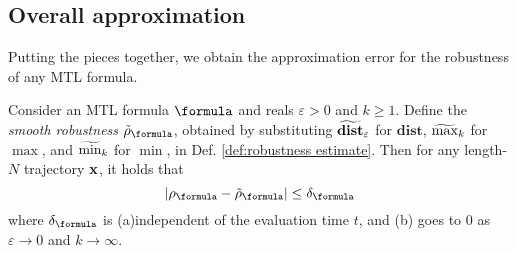 \subsection{Overall approximation}
\label{sec:overall apx}
Putting the pieces together, we obtain the approximation error for the robustness of any MTL formula.
\begin{theorem}
	\label{thm:total apx error}
	Consider an MTL formula $\formula$ and reals $\varepsilon > 0$ and $k \geq 1$. 
	Define the \textit{smooth robustness} $\srobf$, obtained by substituting $\widetilde{\mathbf{dist}}_{\varepsilon}$ for $\mathbf{dist}$, $\widetilde{\max}_k$ for $\max$, and $\widetilde{\min}_k$ for $\min$, in Def. \ref{def:robustness estimate}.
	Then for any length-$N$ trajectory $\mathbf{x}$, it holds that
	\[|\robf-\srobf| \leq \delta_\formula\]
	where $\delta_\formula$ is
	(a)independent of the evaluation time $t$, and 
	(b) goes to 0 as $\varepsilon \rightarrow 0$ and $k \rightarrow \infty$.
\end{theorem}
